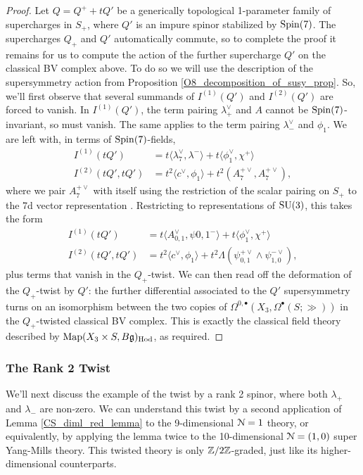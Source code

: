 \documentclass[10pt, oneside]{article}
\begin{document}
\begin{proof}
Let $Q = Q^+ + tQ'$ be a generically topological 1-parameter family of supercharges in $S_+$, where $Q'$ is an impure spinor stabilized by $\mathrm{Spin}(7)$.  The supercharges $Q_+$ and $Q'$ automatically commute, so to complete the proof it remains for us to compute the action of the further supercharge $Q'$ on the classical BV complex above.  To do so we will use the description of the supersymmetry action from Proposition \ref{O8_decomposition_of_susy_prop}.  So, we'll first observe that several summands of $I^{(1)}(Q')$ and $I^{(2)}(Q')$ are forced to vanish.  In $I^{(1)}(Q')$, the term pairing $\lambda_+^\vee$ and $A$ cannot be $\mathrm{Spin}(7)$-invariant, so must vanish.  The same applies to the term pairing $\lambda_-^\vee$ and $\phi_1$. We are left with, in terms of $\mathrm{Spin}(7)$-fields,
\begin{align*}
I^{(1)}(tQ') &= t\langle\lambda_7^\vee, \lambda^-\rangle + t\langle \phi_1^\vee, \chi^+\rangle \\
I^{(2)}(tQ', tQ') &= t^2\langle c^\vee, \phi_1\rangle + t^2 (A_7^{+\vee} , A_7^{+\vee}),
\end{align*}
where we pair $A_7^{+\vee}$ with itself using the restriction of the scalar pairing on $S_+$ to the 7d vector representation .  Restricting to representations of $\mathrm{SU}(3)$, this takes the form
\begin{align*}
I^{(1)}(tQ') &= t\langle A_{0,1}^\vee, \psi{0,1}^-\rangle + t\langle \phi_1^\vee, \chi^+\rangle \\
I^{(2)}(tQ', tQ') &= t^2\langle c^\vee, \phi_1\rangle + t^2 \Lambda(\psi_{0,1}^{+\vee} \wedge \psi_{1,0}^{-\vee}),
\end{align*}
plus terms that vanish in the $Q_+$-twist.  We can then read off the deformation of the $Q_+$-twist by $Q'$: the further differential associated to the $Q'$ supersymmetry turns on an isomorphism between the two copies of $\Omega^{0,\bullet}(X_3, \Omega^\bullet(S;\gg))$ in the $Q_+$-twisted classical BV complex.  This is exactly the classical field theory described by $\operatorname{Map}(X_3 \times S, B\mathfrak{g})_{\mathrm{Hod}}$, as required.
\end{proof}

\subsubsection{The Rank 2 Twist}
We'll next discuss the example of the twist by a rank 2 spinor, where both $\lambda_+$ and $\lambda_-$ are non-zero.  We can understand this twist by a second application of Lemma \ref{CS_diml_red_lemma} to the 9-dimensional $\mathcal{N}=1$ theory, or equivalently, by applying the lemma twice to the 10-dimensional $\mathcal{N}=(1,0)$ super Yang-Mills theory.  This twisted theory is only $\mathbb Z/2\mathbb Z$-graded, just like its higher-dimensional counterparts.
\end{document}
